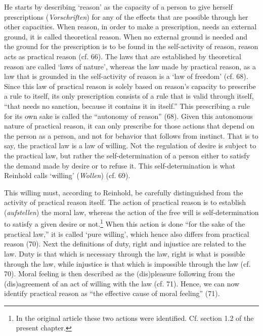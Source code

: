  He starts by describing `reason' as the capacity of a person to give herself prescriptions (\textit{Vorschriften}) for any of the effects that are possible through her other capacities. When reason, in order to make a prescription, needs an external ground, it is called theoretical reason. When no external ground is needed and the ground for the prescription is to be found in the self{-}activity of reason, reason acts as practical reason (cf. 66). The laws that are established by theoretical reason are called `laws of nature', whereas the law made by practical reason, as a law that is grounded in the self{-}activity of reason is a `law of freedom' (cf. 68). Since this law of practical reason is solely based on reason's capacity to prescribe a rule to itself, its only prescription consists of a rule that is valid through itself, ``that needs no sanction, because it contains it in itself.'' This prescribing a rule for its own sake is called the ``autonomy of reason'' (68). Given this autonomous nature of practical reason, it can only prescribe for those actions that depend on the person as a person, and not for behavior that follows from instinct. That is to say, the practical law is a law of willing. Not the regulation of desire is subject to the practical law, but rather the self{-}determination of a person either to satisfy the demand made by desire or to refuse it. This self{-}determination is what Reinhold calls `willing' (\textit{Wollen}) (cf. 69). 

 This willing must, according to Reinhold, be carefully distinguished from the activity of practical reason itself. The action of practical reason is to establish (\textit{aufstellen}) the moral law, whereas the action of the free will is self{-}determination to satisfy a given desire or not.\footnote{ In the original article these two actions were identified. Cf. section 1.2 of the present chapter. } When this action is done ``for the sake of the practical law,'' it is called `pure willing', which hence also differs from practical reason (70). Next the definitions of duty, right and injustice are related to the law. Duty is that which is necessary through the law, right is what is possible through the law, while injustice is that which is impossible through the law (cf. 70). Moral feeling is then described as the (dis)pleasure following from the (dis)agreement of an act of willing with the law (cf. 71). Hence, we can now identify practical reason as ``the effective cause of moral feeling'' (71). 

